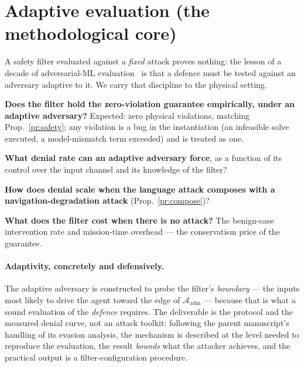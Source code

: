 \documentclass[11pt,a4paper]{article}
\newcommand{\adm}{\mathcal A_{\mathrm{adm}}}
\begin{document}
\section{Adaptive evaluation (the methodological core)}
A safety filter evaluated against a \emph{fixed} attack proves nothing: the
lesson of a decade of adversarial-ML
evaluation~\cite{carlini2017towards,tramer2020adaptive} is that a defence must
be tested against an adversary adaptive to it. We carry that discipline to the
physical setting.

\begin{description}[leftmargin=2.6em,style=nextline]
\item[RQ1] \textbf{Does the filter hold the zero-violation guarantee empirically,
  under an adaptive adversary?} Expected: zero physical violations, matching
  Prop.~\ref{pr:safety}; any violation is a bug in the instantiation (an
  infeasible solve executed, a model-mismatch term exceeded) and is treated as
  one.
\item[RQ2] \textbf{What denial rate can an adaptive adversary force}, as a
  function of its control over the input channel and its knowledge of the
  filter?
\item[RQ3] \textbf{How does denial scale when the language attack composes with
  a navigation-degradation attack} (Prop.~\ref{pr:compose})?
\item[RQ4] \textbf{What does the filter cost when there is no attack?} The
  benign-case intervention rate and mission-time overhead --- the conservatism
  price of the guarantee.
\end{description}

\paragraph{Adaptivity, concretely and defensively.} The adaptive adversary is
constructed to probe the filter's \emph{boundary} --- the inputs most likely to
drive the agent toward the edge of $\adm$ --- because that is what a sound
evaluation of the \emph{defence} requires. The deliverable is the protocol and
the measured denial curve, not an attack toolkit: following the parent
manuscript's handling of its evasion analysis, the mechanism is described at the
level needed to reproduce the evaluation, the result \emph{bounds} what the
attacker achieves, and the practical output is a filter-configuration procedure.
\end{document}
